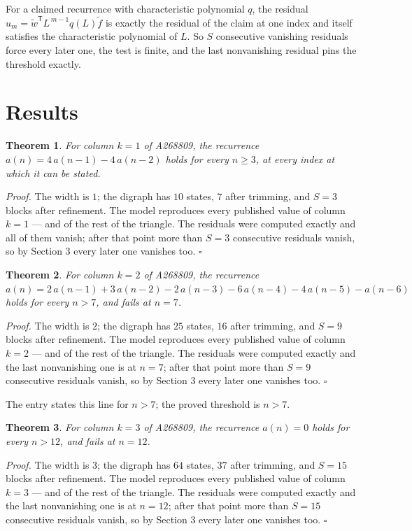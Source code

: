 \documentclass[11pt]{article}
\newtheorem{theorem}{Theorem}
\theoremstyle{definition}
\begin{document}
For a claimed recurrence with characteristic polynomial $q$, the residual $u_m = \tilde w^{\mathsf T}L^{\,m-1}q(L)\tilde f$ is exactly the residual of the claim at one index and itself satisfies the characteristic polynomial of $L$. So $S$ consecutive vanishing residuals force every later one, the test is finite, and the last nonvanishing residual pins the threshold exactly.

\section{Results}

\begin{theorem} For column $k = 1$ of A268809, the recurrence $a(n) = 4\,a(n-1) - 4\,a(n-2)$ holds for every $n \ge 3$, at every index at which it can be stated.\end{theorem}

{\itshape Proof.} The width is $1$; the digraph has $10$ states, $7$ after trimming, and $S = 3$ blocks after refinement. The model reproduces every published value of column $k = 1$ --- and of the rest of the triangle. The residuals were computed exactly and all of them vanish; after that point more than $S = 3$ consecutive residuals vanish, so by Section 3 every later one vanishes too. $\square$

\begin{theorem} For column $k = 2$ of A268809, the recurrence $a(n) = 2\,a(n-1) + 3\,a(n-2) - 2\,a(n-3) - 6\,a(n-4) - 4\,a(n-5) - a(n-6)$ holds for every $n > 7$, and fails at $n = 7$.\end{theorem}

{\itshape Proof.} The width is $2$; the digraph has $25$ states, $16$ after trimming, and $S = 9$ blocks after refinement. The model reproduces every published value of column $k = 2$ --- and of the rest of the triangle. The residuals were computed exactly and the last nonvanishing one is at $n = 7$; after that point more than $S = 9$ consecutive residuals vanish, so by Section 3 every later one vanishes too. $\square$

The entry states this line for $n > 7$; the proved threshold is $n > 7$.

\begin{theorem} For column $k = 3$ of A268809, the recurrence $a(n) = 0$ holds for every $n > 12$, and fails at $n = 12$.\end{theorem}

{\itshape Proof.} The width is $3$; the digraph has $64$ states, $37$ after trimming, and $S = 15$ blocks after refinement. The model reproduces every published value of column $k = 3$ --- and of the rest of the triangle. The residuals were computed exactly and the last nonvanishing one is at $n = 12$; after that point more than $S = 15$ consecutive residuals vanish, so by Section 3 every later one vanishes too. $\square$
\end{document}
